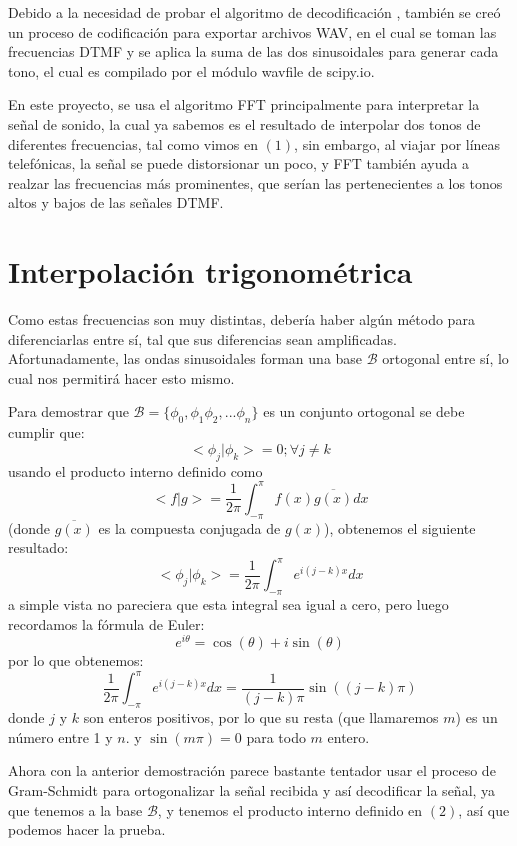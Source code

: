 \documentclass{article}
\begin{document}
Debido a la necesidad de probar el algoritmo de decodificación , también se creó un proceso de codificación para exportar archivos WAV, en el cual se toman las frecuencias DTMF y se aplica la suma de las dos sinusoidales para generar cada tono, el cual es compilado por el módulo wavfile de scipy.io.

En este proyecto, se usa el algoritmo FFT principalmente para interpretar la señal de sonido, la cual ya sabemos es el resultado de interpolar dos tonos de diferentes frecuencias, tal como vimos en $(1)$,  sin embargo, al viajar por líneas telefónicas, la señal se puede distorsionar un poco,  y FFT también ayuda a realzar las frecuencias más prominentes, que serían las pertenecientes a los tonos altos y bajos de las señales DTMF.

\section{Interpolación trigonométrica}

Como estas frecuencias son muy distintas, debería haber algún método para diferenciarlas entre sí, tal que sus diferencias sean amplificadas. Afortunadamente, las ondas sinusoidales forman una base $\mathcal{B}$ ortogonal entre sí, lo cual nos permitirá hacer esto mismo.

Para demostrar que $\mathcal{B}=\{\phi_0,\phi_1\phi_2, ...\phi_n  \}$ es un conjunto ortogonal se debe cumplir que: 
\[<\phi_j|\phi_k>  = 0;  \forall j\neq k\]
usando el producto interno definido como
\begin{equation}
<f|g> = \frac{1}{2\pi}\int_{-\pi}^{\pi}f(x)\overline{g(x)}dx
\end{equation}
(donde $\overline{g(x)}$ es la compuesta conjugada de $g(x)$), obtenemos el siguiente resultado:
\[<\phi_j|\phi_k>  = \frac{1}{2\pi}\int_{-\pi}^{\pi}e^{i(j-k)x}dx \]
a simple vista no pareciera que esta integral sea igual a cero, pero luego recordamos la fórmula de Euler:
\[e^{i\theta}= \cos(\theta)+i\sin(\theta)\]
por lo que obtenemos:
\[\frac{1}{2\pi}\int_{-\pi}^{\pi}e^{i(j-k)x}dx  = \frac{1}{(j-k)\pi} \sin((j-k)\pi)\]
donde $j$ y $k$ son enteros positivos, por lo que su resta (que llamaremos $m$) es un número entre 1 y $n$. y $\sin(m\pi)=0$ para todo $m$ entero.

Ahora con la anterior demostración parece bastante tentador usar el proceso de Gram-Schmidt para ortogonalizar la señal recibida  y así decodificar la señal, ya que tenemos a la base $\mathcal{B}$, y tenemos el producto interno definido en $(2)$, así que podemos hacer la prueba.
\end{document}
